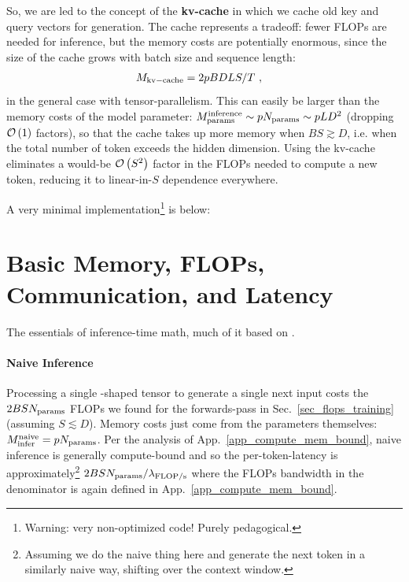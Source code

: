 \documentclass[11pt]{article}
\begin{document}
So, we are led to the concept of the \textbf{kv-cache} in which we cache old key and query vectors for generation.
The cache represents a tradeoff: fewer FLOPs are needed for inference, but the memory costs are potentially
enormous, since the size of the cache grows with batch size and sequence length:
\begin{align}
	M _{ {\rm kv-cache}  } & = 2pBDLS /T\ ,  \label{eq_kv_cache_memory}
\end{align}
in the general case with tensor-parallelism. This can easily be larger than the memory costs of the
model parameter: $ M _{ {\rm params}  } ^{ {\rm  inference}  } \sim p N _{ {\rm params}  } \sim p LD
^{ 2 }  $ (dropping $ \mathcal{O} \left( 1 \right)  $ factors), so that the cache takes up more memory
when $ BS \gtrsim D $, i.e. when the total number of token exceeds the hidden dimension. Using the
kv-cache eliminates a would-be $ \mathcal{O} \left( S ^{ 2 } \right)  $ factor in the FLOPs needed to
compute a new token, reducing it to linear-in-$ S $ dependence everywhere.


A very minimal implementation\footnote{Warning: very non-optimized code! Purely pedagogical.} is below:


\section{Basic Memory, FLOPs, Communication, and Latency}

The essentials of inference-time math, much of it based on \cite{kipply_inference_math}.

\paragraph{Naive Inference} Processing a single -shaped tensor to generate a
single next input costs the $ 2BSN _{ {\rm params}  } $ FLOPs we found for the forwards-pass in
Sec.~\ref{sec_flops_training} (assuming $ S \lesssim D $). Memory costs just come from the parameters
themselves: $ M _{ {\rm infer}  }^{ {\rm naive}  }=pN _{ {\rm params}  } $. Per the analysis of
App.~\ref{app_compute_mem_bound}, naive inference is generally compute-bound and so the
per-token-latency is approximately\footnote{Assuming we do the naive thing here and generate the
    next token in a similarly naive way, shifting over the context window.}  $  2BSN _{ {\rm params}
    }/ \lambda _{ {\rm FLOP/s}  } $ where the FLOPs bandwidth in the denominator is again defined in
    App.~\ref{app_compute_mem_bound}.
\end{document}
